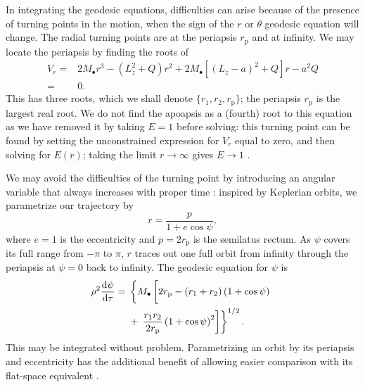 \documentclass[useAMS,usedcolumn,usegraphicx,usenatbib]{mn2e}
\newcommand{\sub}[1]{\ensuremath{_\mathrm{#1}}}
\newcommand{\dd}{\ensuremath{\mathrm{d}}}
\newcommand{\diff}[2]{\ensuremath{\frac{\dd {#1}}{\dd {#2}}}}
\begin{document}
In integrating the geodesic equations, difficulties can arise because of the presence of turning points in the motion, when the sign of the $r$ or $\theta$ geodesic equation will change. The radial turning points are at the periapsis $r\sub{p}$ and at infinity. We may locate the periapsis by finding the roots of
\begin{align}
V_r = {} & 2M_\bullet r^3 - \left(L_z^2+Q\right)r^2 + 2M_\bullet\left[\left(L_z - a\right)^2 + Q\right]r - a^2 Q \nonumber \\
 = {} & 0.
\end{align}
This has three roots, which we shall denote $\{r_1, r_2, r\sub{p}\}$; the periapsis $r\sub{p}$ is the largest real root. We do not find the apoapsis as a (fourth) root to this equation as we have removed it by taking $E = 1$ before solving: this turning point can be found by setting the unconstrained expression for $V_r$ equal to zero, and then solving for $E(r)$; taking the limit $r \rightarrow \infty$ gives $E \rightarrow 1$ \citep{Wilkins1972}.

We may avoid the difficulties of the turning point by introducing an angular variable that always increases with proper time \citep{Drasco2004}: inspired by Keplerian orbits, we parametrize our trajectory by
\begin{equation}
r = \frac{p}{1+e\cos\psi},
\end{equation}
where $e = 1$ is the eccentricity and $p = 2r\sub{p}$ is the semilatus rectum. As $\psi$ covers its full range from $-\pi$ to $\pi$, $r$ traces out one full orbit from infinity through the periapsis at $\psi = 0$ back to infinity. The geodesic equation for $\psi$ is
\begin{align}
\rho^2 \diff{\psi}{\tau} = {} & \left\{M_\bullet\left[2r\sub{p} - \left(r_1 + r_2\right)\left(1 + \cos\psi\right) \vphantom{\frac{r_1 r_2}{2r\sub{p}}} \right.\right. \nonumber \\*
 {} & + \left.\left. \frac{r_1 r_2}{2r\sub{p}}\left(1 + \cos\psi\right)^2\right]\right\}^{1/2}.
\end{align}
This may be integrated without problem. Parametrizing an orbit by its periapsis and eccentricity has the additional benefit of allowing easier comparison with its flat-space equivalent \citep*{Gair2005}.
\end{document}

